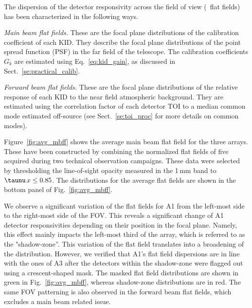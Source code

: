 The dispersion of the detector responsivity across the field of view (\aka\ flat
fields) has been characterized in the following ways.

\noindent \emph{Main beam flat fields.} These are the focal plane
distributions of the calibration coefficient of each KID. {\lp They describe the
focal plane distributions of the point spread function (PSF) in
the far field of the telescope.} The calibration coefficients $G_k$ are
estimated using Eq.~\ref{eq:kid_gain}, as discussed in
Sect.~\ref{se:practical_calib}. 

\noindent \emph{Forward beam flat fields.} These are the focal plane
distributions of the relative response of
each KID to the near field atmospheric background. They are estimated
using the correlation factor of each detector TOI 
to a median common mode estimated off-source (see Sect.~\ref{se:toi_proc} for
more details on common modes).

Figure~\ref{fig:avg_mbff} %
shows the average main beam %
flat field for the three arrays. These have been constructed by
combining the normalized flat fields of five \bms acquired during two
technical observation campaigns. These data were
selected by thresholding the line-of-sight opacity measured in the
1\,mm band to $\taunu\,x \leq 0.85$. The distributions for the average flat
fields are shown in the bottom panel of Fig.~\ref{fig:avg_mbff}.%

We observe a significant variation of the flat fields for A1 from the left-most side
to the right-most side of the FOV. This reveals a significant change of A1
detector responsivities depending on their position in the focal plane. Namely, this
effect mainly impacts the left-most third of the array, which is
referred to as the "shadow-zone''. This variation of the
flat field translates into a broadening of the distribution. However,
we verified that A1's flat field dispersions are in line with the ones of A3 after the
detectors within the shadow-zone were flagged out using a
crescent-shaped mask. The masked flat field distributions are shown in
green in Fig.~\ref{fig:avg_mbff}, %
whereas shadow-zone distributions are in red. The same FOV patterning
is also observed in the forward beam flat fields, which excludes a
main beam related issue. 


